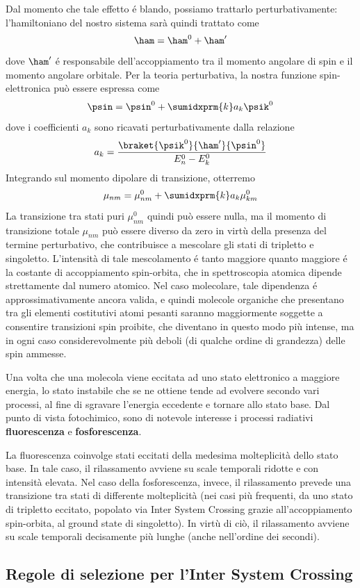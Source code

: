 Dal momento che tale effetto \'e blando, possiamo trattarlo
perturbativamente: l'hamiltoniano del nostro sistema sar\`a quindi
trattato come 
$$
\ham = \ham^0 + \ham'
$$
dove $\ham'$ \'e responsabile dell'accoppiamento tra il momento angolare
di spin e il momento angolare orbitale. Per la teoria perturbativa, la
nostra funzione spin-elettronica pu\`o essere espressa come 
$$
\psin = \psin^0 + \sumidxprm{k} a_k \psik^0 
$$
dove i coefficienti $a_k$ sono ricavati perturbativamente dalla
relazione
$$
a_k = \frac{\braket{\psik^0}{\ham'}{\psin^0}}{E_n^0-E_k^0}
$$
Integrando sul momento dipolare di transizione, otterremo
$$
\mu_{nm} = \mu_{nm}^0 + \sumidxprm{k}a_k\mu_{km}^0
$$
La transizione tra stati puri $\mu_{nm}^0$ quindi pu\`o essere nulla, ma
il momento di transizione totale $\mu_{nm}$ pu\`o essere diverso da zero
in virt\`u della presenza del termine perturbativo, che contribuisce a
mescolare gli stati di tripletto e singoletto. L'intensit\`a di tale
mescolamento \'e tanto maggiore quanto maggiore \'e la costante di
accoppiamento spin-orbita, che in spettroscopia atomica dipende
strettamente dal numero atomico. Nel caso molecolare, tale dipendenza \'e
approssimativamente ancora valida, e quindi molecole organiche che presentano 
tra gli elementi costitutivi atomi pesanti saranno maggiormente soggette a
consentire transizioni spin proibite, che diventano in questo modo pi\`u
intense, ma in ogni caso considerevolmente pi\`u deboli (di qualche
ordine di grandezza) delle spin ammesse.

Una volta che una molecola viene eccitata ad uno stato elettronico a maggiore
energia, lo stato instabile che se ne ottiene tende ad evolvere
secondo vari processi, al fine di sgravare l'energia eccedente e tornare
allo stato base. Dal punto di vista fotochimico, sono di notevole
interesse i processi radiativi \textbf{fluorescenza} e
\textbf{fosforescenza}.

La fluorescenza coinvolge stati eccitati della medesima molteplicit\`a
dello stato base. In tale caso, il rilassamento avviene su scale
temporali ridotte e con intensit\`a elevata.
Nel caso della fosforescenza, invece, il rilassamento prevede una
transizione tra stati di differente molteplicit\`a (nei casi pi\`u
frequenti, da uno stato di tripletto eccitato, popolato via Inter System
Crossing grazie all'accoppiamento spin-orbita, al ground state di
singoletto). In virt\`u di ci\`o, il rilassamento avviene su scale
temporali decisamente pi\`u lunghe (anche nell'ordine dei secondi).

\subsection{Regole di selezione per l'Inter System Crossing}


